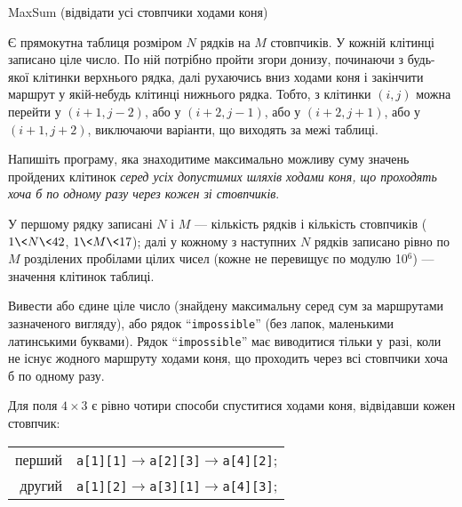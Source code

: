 ﻿\begin{problemAllDefault}{MaxSum (відвідати усі стовпчики ходами коня)}

\label{problem:max-sum-knight-all-cols}

 
Є прямокутна таблиця розміром $N$ рядків на $M$ стовпчиків. У кожній клітинці записано ціле число. 
По ній потрібно пройти згори донизу, починаючи з будь-якої клітинки верхнього рядка, 
далі рухаючись вниз ходами коня і закінчити маршрут у якій-небудь клітинці нижнього рядка. 
Тобто, з клітинки $(i,j)$ можна перейти у ${(i{+}1,j{-}2)}$, 
або у ${(i{+}2,j{-}1)}$, або у ${(i{+}2,j{+}1)}$, або у ${(i{+}1,j{+}2)}$, 
виключаючи варіанти, що виходять за межі таблиці.

Напишіть програму, яка знаходитиме максимально можливу суму значень пройдених клітинок 
\emph{серед усіх допустимих шляхів ходами коня, 
що проходять хоча б по одному разу через кожен зі стовпчиків}. 


\InputFile
  
У першому рядку записані $N$ і $M$ --- кількість рядків і кількість стовпчиків 
(${1{\<}N{\<}42}$, $1{\<}M{\<}17$); далі у кожному з наступних $N$ рядків 
записано рівно по $M$ розділених пробілами цілих чисел (кожне не перевищує по модулю 10$^6$) --- 
значення клітинок таблиці. 



\OutputFile

Вивести або єдине ціле число (знайдену максимальну серед сум за маршрутами зазначеного вигляду),
або рядок ``\texttt{impossible}'' (без лапок, маленькими латинськими буквами). 
Рядок ``\texttt{impossible}'' має виводитися тільки у~разі, 
коли не існує жодного маршруту ходами коня, що проходить через всі стовпчики хоча б по одному разу. 


\Examples

\begin{example}
%
%
\end{example}
 
 
\Note 

Для поля $4\times3$ є рівно чотири способи спуститися ходами коня, відвідавши кожен стовпчик:



\begin{tabular}{rl}
перший
& 
\verb"a[1][1]"$\rightarrow$\verb"a[2][3]"$\rightarrow$\verb"a[4][2]";
 \\ 

другий
& 
\verb"a[1][2]"$\rightarrow$\verb"a[3][1]"$\rightarrow$\verb"a[4][3]";
 \\ 


\end{tabular}
\end{problemAllDefault}
